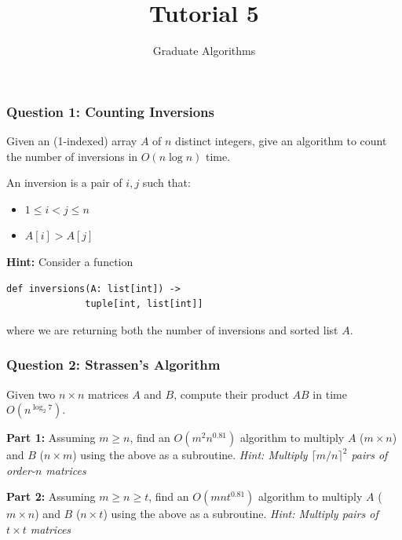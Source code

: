 \documentclass{beamer}
\title{Tutorial 5}
\subtitle{Graduate Algorithms}
\date{}
\author{}
\begin{document}
\frame{\titlepage}

\begin{frame}[fragile]
\frametitle{Question 1: Counting Inversions}

Given an (1-indexed) array $A$ of $n$ distinct integers, give an algorithm to count the number of inversions in $O(n \log n)$ time.

\vspace{0.5cm}

An inversion is a pair of $i,j$ such that:
\begin{itemize}
\item $1 \le i < j \le n$
\item $A[i] > A[j]$
\end{itemize}

\vspace{0.5cm}

\textbf{Hint:} Consider a function 
\begin{verbatim}
def inversions(A: list[int]) -> 
              tuple[int, list[int]]
\end{verbatim}
where we are returning both the number of inversions and sorted list $A$.

\end{frame}

\begin{frame}
\end{frame}

\begin{frame}
\end{frame}

\begin{frame}[fragile]
\frametitle{Question 2: Strassen's Algorithm}

Given two $n \times n$ matrices $A$ and $B$, compute their product $AB$ in time $O(n^{\log_2 7})$.

\vspace{0.3cm}

\textbf{Part 1:} Assuming $m \ge n$, find an $O(m^2 n^{0.81})$ algorithm to multiply $A$ ($m \times n$) and $B$ ($n \times m$) using the above as a subroutine. 
\textit{Hint: Multiply $\lceil m/n \rceil^2$ pairs of order-$n$ matrices}

\vspace{0.3cm}

\textbf{Part 2:} Assuming $m \ge n \ge t$, find an $O(mnt^{0.81})$ algorithm to multiply $A$ ($m \times n$) and $B$ ($n \times t$) using the above as a subroutine. 
\textit{Hint: Multiply pairs of $t \times t$ matrices}

\end{frame}
\end{document}
